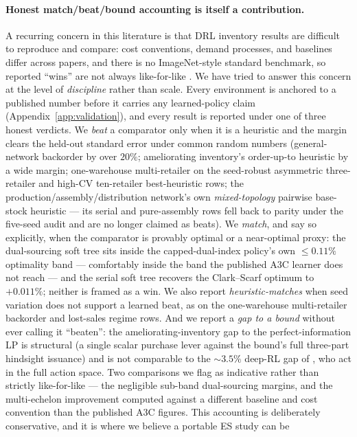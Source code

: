 \documentclass[11pt]{article}
\begin{document}
\paragraph{Honest match/beat/bound accounting is itself a contribution.}
A recurring concern in this literature is that DRL inventory results are difficult to reproduce and
compare: cost conventions, demand processes, and baselines differ across papers, and there is no
ImageNet-style standard benchmark, so reported ``wins'' are not always like-for-like
\citep{boute2022deep,alvo2023networks}. We have tried to answer this concern at the level of
\emph{discipline} rather than scale. Every environment is anchored to a published number before it
carries any learned-policy claim (Appendix~\ref{app:validation}), and every result is reported under
one of three honest verdicts. We \emph{beat} a comparator only when it is a heuristic and the margin
clears the held-out standard error under common random numbers (general-network backorder by over
$20\%$; ameliorating inventory's order-up-to heuristic by a wide margin; one-warehouse multi-retailer on the
seed-robust asymmetric three-retailer and high-CV ten-retailer best-heuristic rows; the
production/assembly/distribution network's own \emph{mixed-topology} pairwise
base-stock heuristic --- its serial and pure-assembly rows fell back to parity under the five-seed
audit and are no longer claimed as beats). We \emph{match}, and say so explicitly, when the comparator is provably optimal
or a near-optimal proxy: the dual-sourcing soft tree sits inside the capped-dual-index policy's own
$\le 0.11\%$ optimality band --- comfortably inside the band the published A3C learner does not reach
--- and the serial soft tree recovers the Clark--Scarf optimum to $+0.011\%$; neither is framed as a
win. We also report \emph{heuristic-matches} when seed variation does not support a learned beat, as on the
one-warehouse multi-retailer backorder and lost-sales regime rows. And we report a \emph{gap to a bound} without ever calling it ``beaten'': the ameliorating-inventory
gap to the perfect-information LP is structural (a single scalar purchase lever against the bound's full
three-part hindsight issuance) and is not comparable to the $\sim\!3.5\%$ deep-RL gap of
\citet{pahrGrunow2025}, who act in the full action space. Two comparisons we flag as indicative rather
than strictly like-for-like --- the negligible sub-band dual-sourcing margins, and the multi-echelon
improvement computed against a different baseline and cost convention than the published A3C figures.
This accounting is deliberately conservative, and it is where we believe a portable ES study can be
\end{document}
